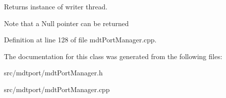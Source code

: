 Returns instance of writer thread. 

Note that a Null pointer can be returned 

Definition at line 128 of file mdtPortManager.cpp.



The documentation for this class was generated from the following files:\begin{DoxyCompactItemize}
\item 
src/mdtport/mdtPortManager.h\item 
src/mdtport/mdtPortManager.cpp\end{DoxyCompactItemize}
